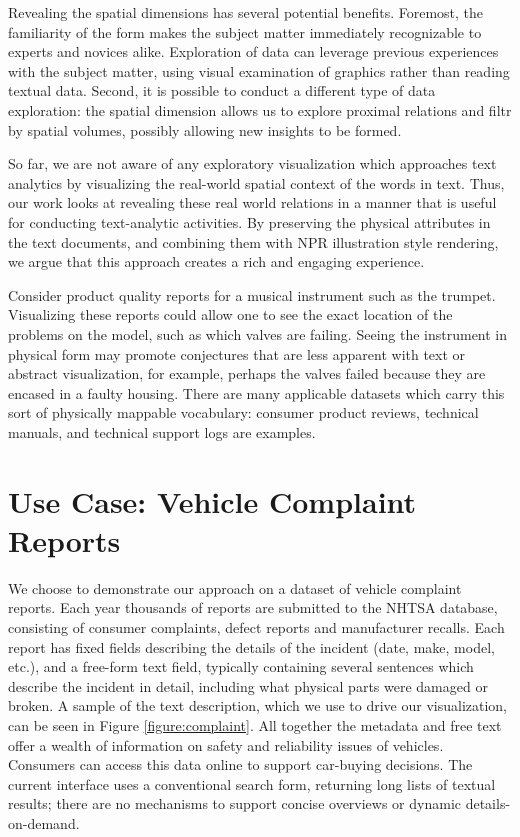 Revealing the spatial dimensions has several potential benefits. Foremost, the
familiarity of the form makes the subject matter immediately recognizable
to experts and novices alike. Exploration of data can leverage previous 
experiences with the subject matter, using visual examination of graphics 
rather than reading textual data. Second, it is possible to conduct a different
type of data exploration: the spatial dimension allows us to explore
proximal relations and filtr by spatial volumes, possibly allowing
new insights to be formed.

So far, we are not aware of any exploratory visualization which approaches text
analytics by visualizing the real-world spatial context of the words in
text. Thus, our work looks at revealing these real world relations in a manner
that is useful for conducting text-analytic activities. By preserving the physical
attributes in the text documents, and combining them with NPR illustration style 
rendering, we argue that this approach creates a rich and engaging experience.

Consider product quality reports for a musical instrument such as the trumpet.
Visualizing these reports could allow one to see the exact location of the problems on the
\threed model, such as which valves are failing. Seeing the instrument
in physical form may promote conjectures that are less apparent
with text or abstract visualization, for example, perhaps the valves
failed because they are encased in a faulty housing. There are many
applicable datasets which carry this sort of physically mappable vocabulary:
consumer product reviews, technical manuals, and technical
support logs are examples.



\section{Use Case: Vehicle Complaint Reports}
We choose to demonstrate our approach on a dataset of vehicle complaint
reports. Each year thousands of reports are submitted to the
NHTSA database, consisting of consumer complaints, defect reports
and manufacturer recalls. Each report has fixed fields describing the
details of the incident (date, make, model, etc.), and a free-form text
field, typically containing several sentences which describe the incident
in detail, including what physical parts were damaged or broken. A sample of the
text description, which we use to drive our visualization, can be seen in Figure
\ref{figure:complaint}.  All together the metadata and free
text offer a wealth of information on safety and reliability issues of
vehicles. Consumers can access this data online to support car-buying
decisions. The current interface uses a conventional search form, returning
long lists of textual results; there are no mechanisms to support
concise overviews or dynamic details-on-demand. 



